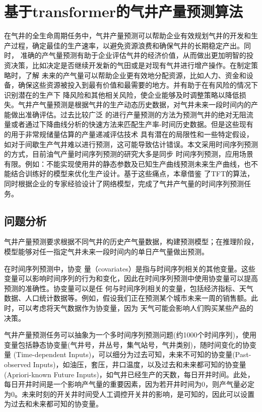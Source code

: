 \chapter{基于transformer的气井产量预测算法}
在气井的全生命周期任务中，气井产量预测可以帮助企业有效规划气井的开发和生产过程，确定最佳的生产速率，以避免资源浪费和确保气井的长期稳定产出。同时，
准确的产气量预测有助于企业评估气井的经济价值，从而做出更加明智的投资决策，比如决定是否继续开发新的气田或是对现有气井进行增产操作。在制定策略时，了解
未来的产气量可以帮助企业更有效地分配资源，比如人力、资金和设备，确保这些资源被投入到最有价值和最需要的地方。并有助于在有风险的情况下识别潜在的生产下
降风险和其他相关风险，使企业能够及时调整策略以降低损失。气井产气量预测是根据气井的生产动态历史数据，对气井未来一段时间内的产能做出准确评估。过去比较广泛
的进行产量预测的方法为预测气井的绝对无阻流量或者通过下降曲线分析的快速方法来匹配生产率-时间历史数据。但是这些现有的用于非常规储量估算的产量递减评估技术
具有潜在的局限性和一些特定假设，如对于间歇生产气井难以进行预测，这可能导致估计错误。本文采用时间序列预测的方式，目前油气产量时间序列预测的研究大多是同步
时间序列预测，应用场景有限。例如：不能实现使用井的静态参数及已知生产曲线预测未来生产曲线，也不能结合训练好的模型来优化生产设计。基于这些痛点，本章借鉴
了TFT的算法，同时根据企业的专家经验设计了网络模型，完成了气井产气量的时间序列预测任务。
\section{问题分析}
气井产量预测要求根据不同气井的历史产气量数据，构建预测模型；在推理阶段，模型能够对任一指定气井未来一段时间内的单日产气量做出预测。

在时间序列预测中，协变
量（covariates）是指与时间序列相关的其他变量。这些变量可以影响时间序列的行为和变化，因此在时间序列预测中使用协变量可以提高预测的准确性。协变量可以是任
何与时间序列相关的变量，包括经济指标、天气数据、人口统计数据等。例如，假设我们正在预测某个城市未来一周的销售额。此时，可以考虑将天气数据作为协变量，因为
天气可能会影响人们购买某些产品的决策。

气井产量预测任务可以抽象为一个多时间序列预测问题(约1000个时间序列)，使用变量包括静态协变量(气井号，井丛号，集气站号，气井类别)，随时间变化的协变量
(Time-dependent Inputs)，可以细分为过去可知，未来不可知的协变量(Past-observed Inputs)，如油压，套压，井口温度，以及过去和未来都可知的协变量
(Apriori-known Future Inputs)，如气井已经生产的天数，每日开井时间。此处，每日开井时间是一个影响产气量的重要因素，因为若开井时间为0，则产气量必定
为0。未来时刻的开关井时间受人工调控开关井的影响，是可知的，因此可以设置为过去和未来都可知的协变量。
